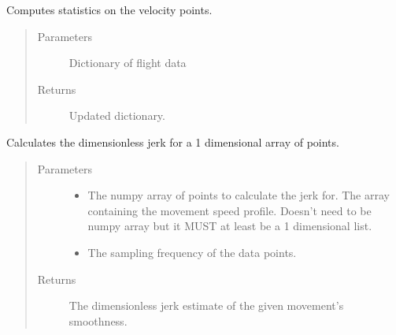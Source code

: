 \documentclass[letterpaper,10pt,english]{sphinxmanual}
\begin{document}

\begin{fulllineitems}
\label{\detokenize{index:src.Views.Graph.computeVelocityStatistics}}
Computes statistics on the velocity points.
\begin{quote}\begin{description}
\item[{Parameters}] \leavevmode
{} \textendash{} Dictionary of flight data

\item[{Returns}] \leavevmode
Updated dictionary.

\end{description}\end{quote}

\end{fulllineitems}


\begin{fulllineitems}
\label{\detokenize{index:src.Views.Graph.dimensionless_jerk}}
Calculates the dimensionless jerk for a 1 dimensional array of points.
\begin{quote}\begin{description}
\item[{Parameters}] \leavevmode\begin{itemize}
\item {} 
 \textendash{} The numpy array of points to calculate the jerk for. The array containing the movement speed profile. Doesn’t need to be numpy array but it MUST at least be a 1 dimensional list.

\item {} 
 \textendash{} The sampling frequency of the data points.

\end{itemize}

\item[{Returns}] \leavevmode
The dimensionless jerk estimate of the given movement’s smoothness.

\end{description}\end{quote}

\end{fulllineitems}
\end{document}
